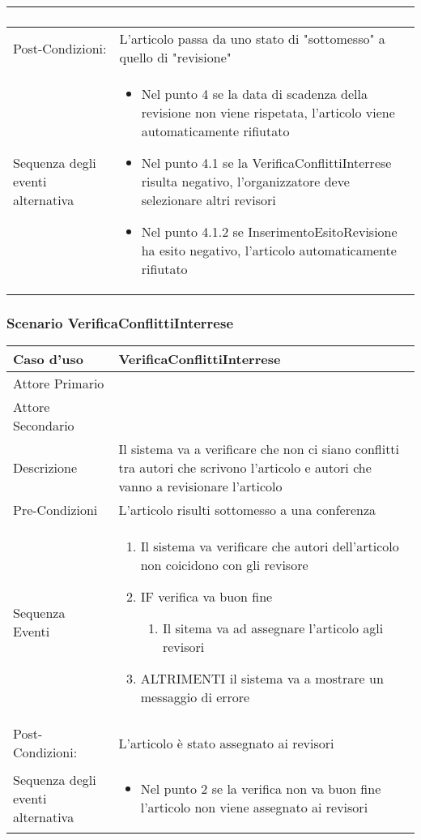 \begin{tabular}{|p{3cm}|p{7cm}|}
\begin{enumerate}
                   \end{enumerate}\\
\hline
Post-Condizioni: &L'articolo passa da uno stato di "sottomesso" a quello di "revisione" \\
\hline
Sequenza degli eventi alternativa & \begin{itemize}
\item Nel punto 4 se la data di scadenza della revisione non viene rispetata, l'articolo viene automaticamente rifiutato
\item Nel punto 4.1 se la VerificaConflittiInterrese risulta negativo, l'organizzatore deve selezionare altri revisori
\item Nel punto 4.1.2 se InserimentoEsitoRevisione ha esito negativo, l'articolo automaticamente rifiutato
\end{itemize}\\
\hline
\end{tabular}

\subsubsection{Scenario VerificaConflittiInterrese}
\begin{tabular}{|p{3cm}|p{7cm}|}
\hline 
\rowcolor{Orchid}
Caso d'uso & VerificaConflittiInterrese \\
\hline
Attore Primario & \\
\hline
Attore Secondario & \\
\hline
Descrizione & Il sistema va a verificare che non ci siano conflitti tra autori che scrivono l'articolo e autori che vanno a revisionare l'articolo\\
\hline
Pre-Condizioni& L'articolo risulti sottomesso a una conferenza\\
\hline
  Sequenza Eventi&
                  \begin{enumerate}
                   \item Il sistema va verificare che autori dell'articolo non coicidono con gli revisore
                   \item IF verifica va buon fine
                    \begin{enumerate}
                      \item Il sitema va ad assegnare l'articolo agli revisori
                    \end{enumerate}
                    \item ALTRIMENTI il sistema va a mostrare un messaggio di errore
                  \end{enumerate}\\
\hline
Post-Condizioni: & L'articolo è stato assegnato ai revisori\\
\hline
Sequenza degli eventi alternativa & \begin{itemize}
  \item Nel punto 2 se la verifica non va buon fine l'articolo non viene assegnato ai revisori
\end{itemize} \\
\hline
\end{tabular}

